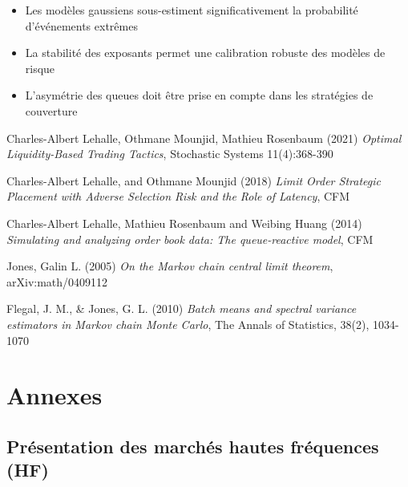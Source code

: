\documentclass[12pt,a4paper]{article}
\theoremstyle{definition}
\theoremstyle{remark}
\begin{document}
\begin{itemize}
    \item Les modèles gaussiens sous-estiment significativement la probabilité d'événements extrêmes
    \item La stabilité des exposants permet une calibration robuste des modèles de risque
    \item L'asymétrie des queues doit être prise en compte dans les stratégies de couverture
\end{itemize}

    
    \newpage
    \begin{thebibliography}{9}

    Charles-Albert Lehalle, Othmane Mounjid, Mathieu Rosenbaum (2021)
    \textit{Optimal Liquidity-Based Trading Tactics},
    Stochastic Systems 11(4):368-390

    Charles-Albert Lehalle, and Othmane Mounjid (2018)
    \textit{Limit Order Strategic Placement with Adverse Selection Risk and the Role of Latency},
    CFM

    Charles-Albert Lehalle, Mathieu Rosenbaum and Weibing Huang (2014)
    \textit{Simulating and analyzing order book data: The queue-reactive model},
    CFM

    Jones, Galin L. (2005)
    \textit{On the Markov chain central limit theorem},
    arXiv:math/0409112

Flegal, J. M., & Jones, G. L. (2010)
\textit{Batch means and spectral variance estimators in Markov chain Monte Carlo},
The Annals of Statistics, 38(2), 1034-1070


    \end{thebibliography}

\appendix
\section{Annexes}

\subsection{Présentation des marchés hautes fréquences (HF)}
\end{document}
